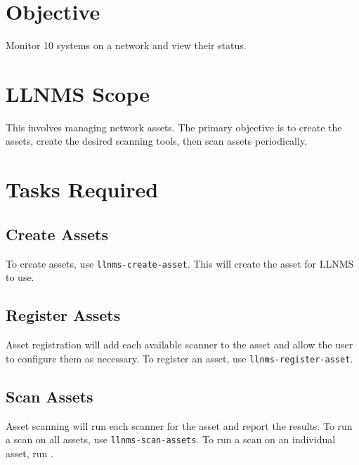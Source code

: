 \documentclass[12pt]{report}
\begin{document}
\section*{Objective}
Monitor 10 systems on a network and view their status.

\section*{LLNMS Scope}
This involves managing network assets.  The primary objective is to 
create the assets, create the desired scanning tools, then scan assets
periodically.

\section*{Tasks Required}

\subsection*{Create Assets}
To create assets, use \texttt{llnms-create-asset}.  This will create
the asset for LLNMS to use.

\subsection*{Register Assets}
Asset registration will add each available scanner to the asset and allow the user to 
configure them as necessary. To register an asset, use \texttt{llnms-register-asset}.

\subsection*{Scan Assets}
Asset scanning will run each scanner for the asset and report the results.  To run a scan
on all assets, use \texttt{llnms-scan-assets}.  To run a scan on an individual asset, run
. 
\end{document}
